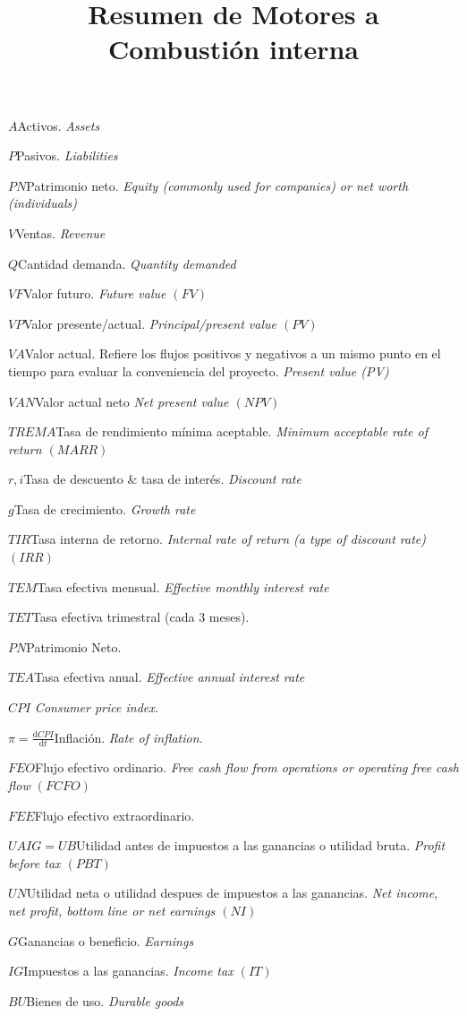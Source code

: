 \documentclass[twocolumn,10pt]{article}
\newcommand{\glossml}[3]{$#1$\indent #2 \emph{#3}  \par \vspace{.4cm} } %
\newcommand{\di}{\textrm{d}}
\begin{document}
\title{Resumen de Motores a Combustión interna}
{}
\glossml{A}{Activos.}{Assets}
\glossml{P}{Pasivos.}{Liabilities}

\glossml{PN}{Patrimonio neto.}{Equity (commonly used for companies) or net worth (individuals)}

\glossml{V}{Ventas.}{Revenue}

\glossml{Q}{Cantidad demanda.}{Quantity demanded}

\glossml{VF}{Valor futuro.}{Future value $(FV)$}
\glossml{VP}{Valor presente/actual.}{Principal/present value $(PV)$}
\glossml{VA}{Valor actual. Refiere los flujos positivos y negativos a un mismo punto en el tiempo para evaluar la conveniencia del proyecto.}{Present value (PV)}

\glossml{VAN}{Valor actual neto}{Net present value $(NPV)$}

\glossml{TREMA}{Tasa de rendimiento mínima aceptable.}{Minimum acceptable rate of return $(MARR)$}

\glossml{r,i}{Tasa de descuento \& tasa de interés.}{Discount rate}



\glossml{g}{Tasa de crecimiento.}{Growth rate}

\glossml{TIR}{Tasa interna de retorno.}{Internal rate of return (a type of discount rate) $(IRR)$}

\glossml{TEM}{Tasa efectiva mensual.}{Effective monthly interest rate}

\glossml{TET}{Tasa efectiva trimestral (cada 3 meses).}{}
\glossml{PN}{Patrimonio Neto.}{}
\glossml{TEA}{Tasa efectiva anual.}{Effective annual interest rate}
\glossml{CPI}{}{Consumer price index.}
\glossml{\pi=\frac{\di CPI}{\di t}}{Inflación.}{Rate of inflation.}
\glossml{FEO}{Flujo efectivo ordinario.}{Free cash flow from operations or operating free cash flow $(FCFO)$}
\glossml{FEE}{Flujo efectivo extraordinario.}{}
\glossml{UAIG=UB}{Utilidad antes de impuestos a las ganancias o utilidad bruta.}{Profit before tax $(PBT)$}
\glossml{UN}{Utilidad neta o utilidad despues de impuestos a las ganancias.}{Net income, net profit, bottom line or net earnings $(NI)$}
\glossml{G}{Ganancias o beneficio.}{Earnings}
\glossml{IG}{Impuestos a las ganancias.}{Income tax $(IT)$}
\glossml{BU}{Bienes de uso.}{Durable goods}
\end{document}
